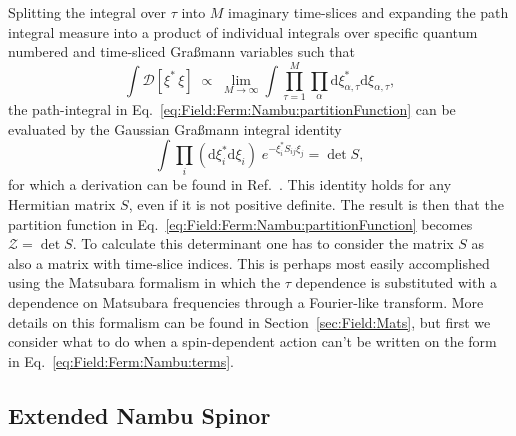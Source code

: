 Splitting the integral over $\tau$ into $M$ imaginary time-slices and expanding the path integral measure into a product of individual integrals
over specific quantum numbered and time-sliced Gra\ss mann variables such that 
\begin{equation}
    \label{eq:Field:Ferm:Nambu:fieldMeasure}
    \int\!\mathcal{D}[\xi^\ast\,\xi] \;\propto\; \lim_{M\rightarrow\infty}\int\prod_{\tau=1}^M\prod_\alpha\mathrm{d}\xi^\ast_{\alpha,\tau}\mathrm{d}\xi_{\alpha,\tau},
\end{equation}
the path-integral in Eq.~\eqref{eq:Field:Ferm:Nambu:partitionFunction}
can be evaluated by the Gaussian Gra\ss mann integral identity
\begin{equation}
    \label{eq:Field:Ferm:Nambu:quadraticGrassmannInt}
    \int\prod_i(\mathrm{d}\xi_i^\ast\mathrm{d}\xi_i)\;e^{-\xi_i^\ast S_{ij}\xi_j} = \det S,
\end{equation}
for which a derivation can be found in Ref.~\cite{NegeleOrland98}. This identity holds for any Hermitian matrix $S$, even if it is not positive definite.
The result is then that the partition function in Eq.~\eqref{eq:Field:Ferm:Nambu:partitionFunction}
becomes $\mathcal{Z} = \det S$. To calculate this determinant one has to consider the matrix $S$ as also a matrix with
time-slice indices. This is perhaps most easily accomplished using the Matsubara formalism in which the $\tau$ dependence is substituted with a dependence on Matsubara
frequencies through a Fourier-like transform. More details on this formalism can be found in Section~\ref{sec:Field:Mats}, but first we consider
what to do when a spin-dependent action can't be written on the form in Eq.~\eqref{eq:Field:Ferm:Nambu:terms}.

\subsection{Extended Nambu Spinor}

